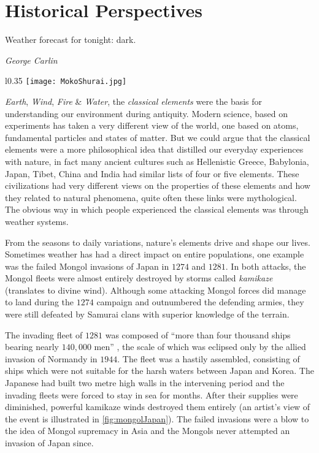 \chapter{Historical Perspectives}\label{chapter:introduction}

\epigraph{Weather forecast for tonight: dark.}{\textit{George Carlin}}

\begin{wrapfigure}{l}{0.35\textwidth}
    \centering\texttt{[image: MokoShurai.jpg]}
    \caption{
        {\small
            The Mongol fleet destroyed in a typhoon, 1847. \textit{Source}: Kikuchi Y\={o}sai / 
            Tokyo National Museum (Public domain)
        } 
    }\label{fig:mongolJapan}
\end{wrapfigure}

\emph{Earth}, \emph{Wind}, \emph{Fire} \& \emph{Water}, the \emph{classical elements} were the 
basis for understanding our environment during antiquity. Modern science, based on experiments has 
taken a very different view of the world, one based on atoms, fundamental particles and states of 
matter. But we could argue that the classical elements were a more philosophical idea that 
distilled our everyday experiences with nature, in fact many ancient cultures such as 
Hellenistic Greece, Babylonia, Japan, Tibet, China and India had similar lists of four or five 
elements. These civilizations had very different views on the properties of these elements and how 
they related to natural phenomena, quite often these links were mythological. The obvious way in 
which people experienced the classical elements was through weather systems. 

From the seasons to daily variations, nature's elements drive and shape our lives. Sometimes 
weather has had a direct impact on entire populations, one example was the failed Mongol invasions 
of Japan in $1274$ and $1281$. In both attacks, the Mongol fleets were almost entirely destroyed by 
storms called \emph{kamikaze} (translates to divine wind). Although some attacking Mongol forces 
did manage to land during the $1274$ campaign and outnumbered the defending armies, they were still 
defeated by Samurai clans with superior knowledge of the terrain. 

The invading fleet of $1281$ was composed of \enquote{more than four thousand ships bearing nearly 
$140,000$ men} \citep[pg.~17]{mcclain2002japan}, the scale of which was eclipsed only by the allied 
invasion of Normandy in $1944$. The fleet was a hastily assembled, consisting of ships which were 
not suitable for the harsh waters between Japan and Korea. The Japanese had built two metre high 
walls in the intervening period and the invading fleets were forced to stay in sea for months. 
After their supplies were diminished, powerful kamikaze winds destroyed them entirely (an artist's 
view of the event is illustrated in \cref{fig:mongolJapan}). The failed invasions were a blow to 
the idea of Mongol supremacy in Asia and the Mongols never attempted an invasion of Japan since.

